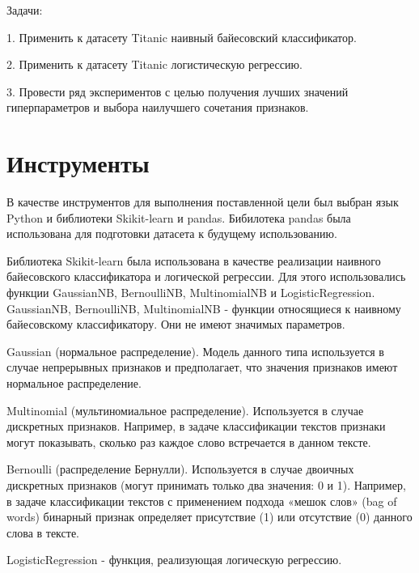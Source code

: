 \documentclass[a4paper,12pt]{article}
\begin{document}
	\vspace{0.5cm}
	Задачи: 
	
	\vspace{0.5cm}
	1. Применить к датасету Titanic наивный байесовский классификатор.
	
	\vspace{0.5cm}
	2. Применить к датасету Titanic логистическую регрессию.

	\vspace{0.5cm}
	3. Провести ряд экспериментов с целью получения лучших значений гиперпараметров и выбора наилучшего сочетания признаков.
	
\newpage\section{Инструменты} 
	В качестве инструментов для выполнения поставленной цели был выбран язык Python и библиотеки Skikit-learn и pandas.
	Бибилотека pandas была использована для подготовки датасета к будущему использованию.
	
	\vspace{0.5cm}
	Библиотека Skikit-learn была использована  в качестве реализации наивного байесовского классификатора и логической регрессии. Для этого использовались функции GaussianNB, BernoulliNB, MultinomialNB и LogisticRegression. GaussianNB, BernoulliNB, MultinomialNB - функции относящиеся к наивному байесовскому классификатору. Они не имеют значимых параметров.
	
	\vspace{0.5cm}
	Gaussian (нормальное распределение). Модель данного типа используется в случае непрерывных признаков и предполагает, что значения признаков имеют нормальное распределение.
	
	\vspace{0.5cm}
	Multinomial (мультиномиальное распределение). Используется в случае дискретных признаков. Например, в задаче классификации текстов признаки могут показывать, сколько раз каждое слово встречается в данном тексте.
	
	\vspace{0.5cm}
	Bernoulli (распределение Бернулли). Используется в случае двоичных дискретных признаков (могут принимать только два значения: 0 и 1). Например, в задаче классификации текстов с применением подхода «мешок слов» (bag of words) бинарный признак определяет присутствие (1) или отсутствие (0) данного слова в тексте.
	
	\vspace{0.5cm}
	LogisticRegression - функция, реализующая логическую регрессию.
	
\end{document}
